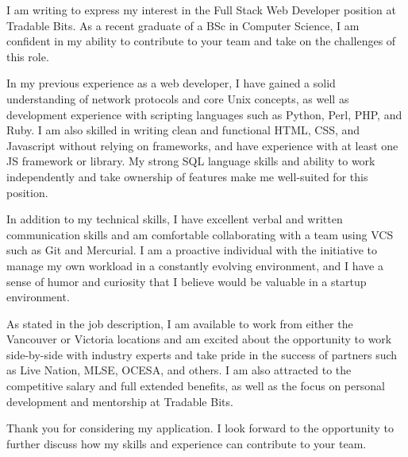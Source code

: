 \documentclass[11pt, a4paper]{awesome-cv}
\begin{document}
\makecvheader[R]


\makelettertitle

\begin{cvletter}



I am writing to express my interest in the Full Stack Web Developer position at Tradable Bits. As a recent graduate of a BSc in Computer Science, I am confident in my ability to contribute to your team and take on the challenges of this role.

In my previous experience as a web developer, I have gained a solid understanding of network protocols and core Unix concepts, as well as development experience with scripting languages such as Python, Perl, PHP, and Ruby. I am also skilled in writing clean and functional HTML, CSS, and Javascript without relying on frameworks, and have experience with at least one JS framework or library. My strong SQL language skills and ability to work independently and take ownership of features make me well-suited for this position.

In addition to my technical skills, I have excellent verbal and written communication skills and am comfortable collaborating with a team using VCS such as Git and Mercurial. I am a proactive individual with the initiative to manage my own workload in a constantly evolving environment, and I have a sense of humor and curiosity that I believe would be valuable in a startup environment.

As stated in the job description, I am available to work from either the Vancouver or Victoria locations and am excited about the opportunity to work side-by-side with industry experts and take pride in the success of partners such as Live Nation, MLSE, OCESA, and others. I am also attracted to the competitive salary and full extended benefits, as well as the focus on personal development and mentorship at Tradable Bits.

Thank you for considering my application. I look forward to the opportunity to further discuss how my skills and experience can contribute to your team.


\end{cvletter}


\makeletterclosing
\end{document}
